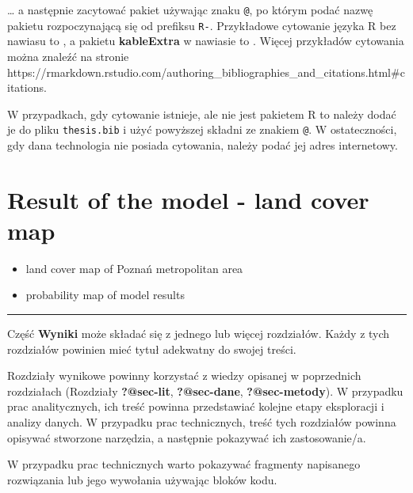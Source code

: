 \documentclass{amuthesis}
\begin{document}
\ldots{} a następnie zacytować pakiet używając znaku \texttt{@}, po
którym podać nazwę pakietu rozpoczynającą się od prefiksu \texttt{R-}.
Przykładowe cytowanie języka R bez nawiasu to \textcite{R-base}, a
pakietu \textbf{kableExtra} w nawiasie to \autocite{R-kableExtra}.
Więcej przykładów cytowania można znaleźć na stronie
https://rmarkdown.rstudio.com/authoring\_bibliographies\_and\_citations.html\#citations.

W przypadkach, gdy cytowanie istnieje, ale nie jest pakietem R to należy
dodać je do pliku \texttt{thesis.bib} i użyć powyższej składni ze
znakiem \texttt{@}. W ostateczności, gdy dana technologia nie posiada
cytowania, należy podać jej adres internetowy.


\hypertarget{sec-results-map}{%
\chapter{Result of the model - land cover map}\label{sec-results-map}}

\begin{itemize}
\item
  land cover map of Poznań metropolitan area
\item
  probability map of model results
\end{itemize}

\begin{center}\rule{0.5\linewidth}{0.5pt}\end{center}

Część \textbf{Wyniki} może składać się z jednego lub więcej rozdziałów.
Każdy z tych rozdziałów powinien mieć tytuł adekwatny do swojej treści.

Rozdziały wynikowe powinny korzystać z wiedzy opisanej w poprzednich
rozdziałach (Rozdziały \textbf{?@sec-lit}, \textbf{?@sec-dane},
\textbf{?@sec-metody}). W przypadku prac analitycznych, ich treść
powinna przedstawiać kolejne etapy eksploracji i analizy danych. W
przypadku prac technicznych, treść tych rozdziałów powinna opisywać
stworzone narzędzia, a następnie pokazywać ich zastosowanie/a.

W przypadku prac technicznych warto pokazywać fragmenty napisanego
rozwiązania lub jego wywołania używając bloków kodu.

\begin{Shaded}
\begin{Highlighting}[]
\OtherTok{=} 
  \NormalTok{)}
\NormalTok{\}}
\NormalTok{(}\NormalTok{)}
\end{Highlighting}
\end{Shaded}
\end{document}
